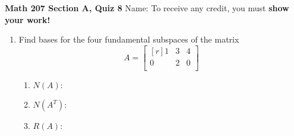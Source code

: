 \documentclass[fleqn,12pt]{article}
\begin{document}
\vskip-2cm

\noindent \textbf{Math 207 Section A, Quiz 8} \hfill
Name: \underline{\phantom{XXXXXXXXXXXXXX}}
\vskip5mm
\noindent To receive any credit, you must {\bf show your work!}

\begin{enumerate}
\item 
  Find bases for the four fundamental subspaces of the matrix
  \[A = 
  \begin{bmatrix*}[r]
    1 &	3&	4	\\
    0 &	2&	0\\
  \end{bmatrix*}
  \]
  \vskip5mm
  \begin{enumerate}
  \item 
    $N(A)$:


    \hfill{}
    \vskip1cm

  \item %
    $N(A^T)$:

    \hfill{}
    \vskip1cm

  \item $R(A)$:

    \hfill{}


\end{enumerate}
\end{enumerate}
\end{document}
